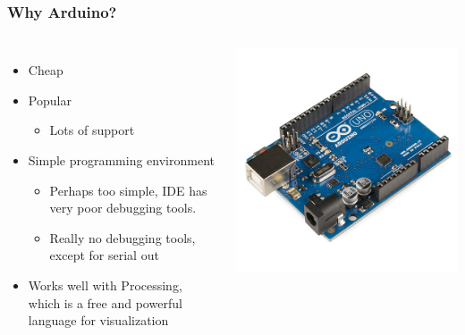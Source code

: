 \documentclass{beamer}
\begin{document}
\begin{frame}
\frametitle{Why Arduino?}
\begin{columns}[t]
\begin{itemize}
\item{Cheap}
\item {Popular}
\begin{itemize}
\item {Lots of support}
\end{itemize}
\item {Simple programming environment}
\begin{itemize}
\item {Perhaps too simple, IDE has very poor debugging tools.}
\item {Really no debugging tools, except for serial out}
\end{itemize}
\item{Works well with Processing, which is a free and powerful language for visualization}
\end{itemize}
\includegraphics[scale=.25]{Arduino_Uno_-_R3.jpg}
\end{columns}
\end{frame}
\end{document}

